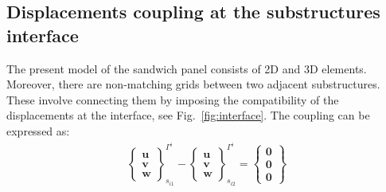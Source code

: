 \documentclass[materials,article,submit,moreauthors,pdftex]{Definitions/mdpi}
\providecommand{\DIFadd}[1]{{\protect\color{blue}{#1}}} %
\providecommand{\DIFaddbegin}{} %
\providecommand{\DIFaddend}{} %
\begin{document}
\subsection{Displacements coupling at the substructures interface}
\label{sec:interface}
The present model of the sandwich panel consists of 2D and 3D elements. 
Moreover, there are non-matching grids between two adjacent substructures. 
These involve connecting them by imposing the compatibility of the displacements at the interface, see Fig.~\ref{fig:interface}.
\DIFaddbegin \DIFadd{This type of connection is implemented by means of interface elements based on Lagrange multipliers, which are interpreted as forces responsible for determining the appropriate displacements of nodes.
}\DIFaddend The coupling can be expressed as:
\begin{eqnarray}
\left\{\begin{array}{c}
\textbf{u}\\
\textbf{v}\\
\textbf{w}
\end{array}\right\}_{s_{i1}}^{\Gamma^i}-
\left\{\begin{array}{c}
\textbf{u}\\
\textbf{v}\\
\textbf{w}
\end{array}\right\}_{s_{i2}}^{\Gamma^i}=
\left\{\begin{array}{c}
\textbf{0}\\
\textbf{0}\\
\textbf{0}
\end{array}\right\}
\label{eq:coupling}
\end{eqnarray}
\end{document}
